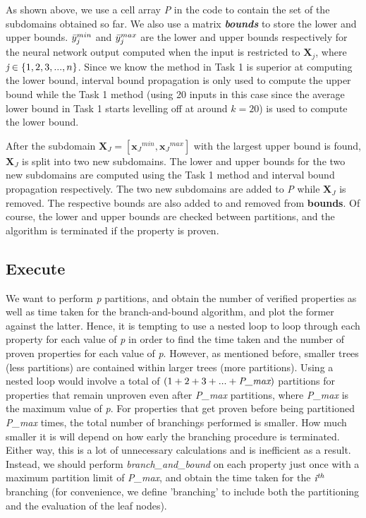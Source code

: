 \documentclass[11pt]{article}
\begin{document}
As shown above, we use a cell array \emph{P} in the code to contain the set of the subdomains obtained so far. We also use a matrix \textbf{\emph{bounds}} to store the lower and upper bounds. ${{\Bar{y}_j}^{min}}$ and ${{\Bar{y}_j}^{max}}$ are the lower and upper bounds respectively for the neural network output computed when the input is restricted to ${\textbf{X}_j}$, where $\emph{j}\in{\{1,2,3,...,n\}}$. Since we know the method in Task 1 is superior at computing the lower bound, interval bound propagation is only used to compute the upper bound while the Task 1 method (using 20 inputs in this case since the average lower bound in Task 1 starts levelling off at around $k=20$) is used to compute the lower bound.


After the subdomain ${\textbf{X}_J}=[{\textbf{x}_J}^{min},{\textbf{x}_J}^{max}]$ with the largest upper bound is found, ${\textbf{X}_J}$ is split into two new subdomains. The lower and upper bounds for the two new subdomains are computed using the Task 1 method and interval bound propagation respectively. The two new subdomains are added to \emph{P} while ${\textbf{X}_J}$ is removed. The respective bounds are also added to and removed from \textbf{bounds}. Of course, the lower and upper bounds are checked between partitions, and the algorithm is terminated if the property is proven.

\subsection{Execute}

We want to perform \emph{p} partitions, and obtain the number of verified properties as well as time taken for the branch-and-bound algorithm, and plot the former against the latter. Hence, it is tempting to use a nested loop to loop through each property for each value of \emph{p} in order to find the time taken and the number of proven properties for each value of \emph{p}. However, as mentioned before, smaller trees (less partitions) are contained within larger trees (more partitions). Using a nested loop would involve a total of $(1+2+3+...+\emph{P\_max})$ partitions for properties that remain unproven even after \emph{P\_max} partitions, where \emph{P\_max} is the maximum value of \emph{p}. For properties that get proven before being partitioned \emph{P\_max} times, the total number of branchings performed is smaller. How much smaller it is will depend on how early the branching procedure is terminated. Either way, this is a lot of unnecessary calculations and is inefficient as a result. Instead, we should perform \emph{branch\_and\_bound} on each property just once with a maximum partition limit of \emph{P\_max}, and obtain the time taken for the $\emph{i\textsuperscript{th}}$ branching (for convenience, we define 'branching' to include both the partitioning and the evaluation of the leaf nodes). 
\end{document}
